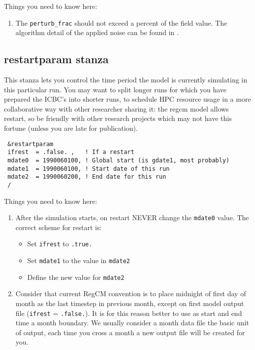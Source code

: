 Things you need to know here:

\begin{enumerate}
\item The \verb=perturb_frac= should not exceed a percent of the field value.
The algorithm detail of the applied noise can be found in \cite{tao_ense}.
\end{enumerate}

\subsection{restartparam stanza}

This stanza lets you control the time period the model is currently simulating
in this particular run. You may want to split longer runs for which you have
prepared the ICBC's into shorter runs, to schedule HPC resource usage in a more
collaborative way with other researcher sharing it: the regcm model allows
restart, so be friendly with other research projects which may not have this
fortune (unless you are late for publication).

{\footnotesize
\begin{Verbatim}
 &restartparam
 ifrest  = .false. ,   ! If a restart
 mdate0  = 1990060100, ! Global start (is gdate1, most probably)
 mdate1  = 1990060100, ! Start date of this run
 mdate2  = 1990060200, ! End date for this run
 /
\end{Verbatim}
}

Things you need to know here:

\begin{enumerate}
\item After the simulation starts, on restart NEVER change the \verb=mdate0=
value. The correct scheme for restart is:
\begin{itemize}
\item Set \verb=ifrest= to \verb=.true.=
\item Set \verb=mdate1= to the value in \verb=mdate2=
\item Define the new value for \verb=mdate2=
\end{itemize}
\item Consider that current RegCM convention is to place midnight of first
day of month as the last timestep in previous month, except on first model
output file (\verb=ifrest= = \verb=.false.=). It is for this reason better
to use as start and end time a month boundary. We usually consider a month
data file the basic unit of output, each time you cross a month a new output
file will be created for you.
\end{enumerate}

